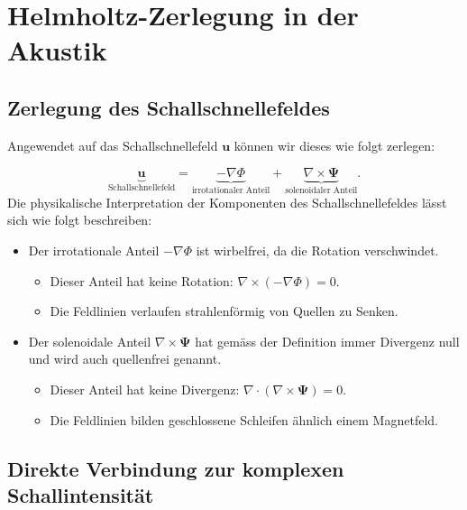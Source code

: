 %
%
%
%
\section{Helmholtz-Zerlegung in der Akustik
\label{helmholtz:section:Helmholtz_Zerlegung_Akustik}}


\subsection{Zerlegung des Schallschnellefeldes
\label{helmholtz:subsection:Zerlegung_Schallschnelle}}
Angewendet auf das Schallschnellefeld $\boldsymbol{u}$ können wir dieses wie folgt zerlegen:
 
\begin{equation}
\underbrace{\boldsymbol{u}}_{\text{Schallschnellefeld}} =  \underbrace{-\nabla \Phi}_{\text{irrotationaler~Anteil}} + \underbrace{\nabla \times \boldsymbol{\Psi}}_{\text{solenoidaler~Anteil}}.
\end{equation}
Die physikalische Interpretation der Komponenten des Schallschnellefeldes lässt sich wie folgt beschreiben:
 
\begin{itemize}
\item Der irrotationale Anteil $-\nabla \Phi$ ist wirbelfrei, da die Rotation verschwindet.
\begin{itemize}
\item Dieser Anteil hat keine Rotation: $\nabla \times (-\nabla \Phi) = 0$.
\item Die Feldlinien verlaufen strahlenförmig von Quellen zu Senken.
\end{itemize}
 
\item Der solenoidale Anteil $\nabla \times \boldsymbol{\Psi}$ hat gemäss der Definition immer Divergenz null und wird auch quellenfrei genannt.
\begin{itemize}
\item Dieser Anteil hat keine Divergenz: $\nabla \cdot (\nabla \times \boldsymbol{\Psi}) = 0$.
\item Die Feldlinien bilden geschlossene Schleifen ähnlich einem Magnetfeld.
\end{itemize}
\end{itemize}

\subsection{Direkte Verbindung zur komplexen Schallintensität
\label{helmholtz:subsection:Zerlegung_Schallschnelle}}

